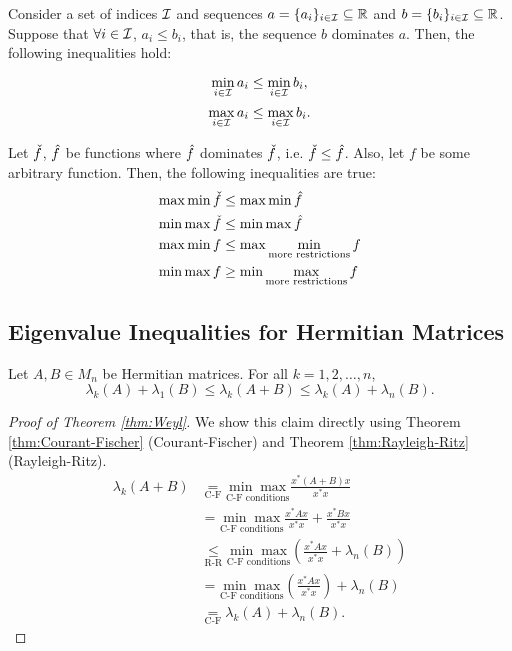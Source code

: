 \begin{note*}
\label{note:min-max-properties}
Consider a set of indices $\mathcal{I}$ and sequences $a = \{a_i\}_{i \in \mathcal{I}} \subseteq \mathbb R$ and $b = \{b_i\}_{i \in \mathcal{I}} \subseteq \mathbb R$. Suppose that $\forall i \in \mathcal{I}$, $a_i \leq b_i$, that is, the sequence $b$ dominates $a$. Then, the following inequalities hold:
\begin{multicols}{2}
\noindent $$
\min_{i \in \mathcal{I}} a_i \leq \min_{i \in \mathcal{I}} b_i,
$$
$$
\max_{i \in \mathcal{I}} a_i \leq \max_{i \in \mathcal{I}} b_i.
$$
\end{multicols}
Let $\Check{f}$, $\Hat{f}$ be functions where $\Hat{f}$ dominates $\Check{f}$, i.e. $\Check{f} \leq \Hat{f}$. Also, let $f$ be some arbitrary function. Then, the following inequalities are true:
\begin{align*}
    \max \min \Check{f} &\leq \max \min \Hat{f} \\
    \min \max \Check{f} &\leq \min \max \Hat{f} \\
    \max \min f &\leq \max \min_{\text{more restrictions}} f \\
    \min \max f &\geq \min \max_{\text{more restrictions}} f
\end{align*}
\end{note*}

\subsection{Eigenvalue Inequalities for Hermitian Matrices}

\begin{theorem}[Weyl]
\label{thm:Weyl}
Let $A, B \in M_n$ be Hermitian matrices. For all $k = 1, 2, \dots, n$,
$$
\lambda_k(A) + \lambda_1(B) \leq \lambda_k(A+B) \leq \lambda_k(A) + \lambda_n(B).
$$
\end{theorem}

\begin{proof}[Proof of Theorem \ref{thm:Weyl}]
We show this claim directly using Theorem \ref{thm:Courant-Fischer} (Courant-Fischer) and Theorem \ref{thm:Rayleigh-Ritz} (Rayleigh-Ritz).
\begin{align*}
    \lambda_k(A+B) 
        &\underset{\text{C-F}}{=} \underset{\text{C-F conditions}}{\min\max} \frac{x^*(A+B)x}{x^*x} \\
        &= \underset{\text{C-F conditions}}{\min\max} \frac{x^*Ax}{x^*x} + \frac{x^*Bx}{x^*x} \\
        &\underset{{\text{R-R}}}{\leq} \underset{\text{C-F conditions}}{\min\max} \left(\frac{x^*Ax}{x^*x} + \lambda_n(B)\right) \\
        &= \underset{\text{C-F conditions}}{\min\max} \left(\frac{x^*Ax}{x^*x}\right) + \lambda_n(B) \\
        &\underset{\text{C-F}}{=} \lambda_k(A) + \lambda_n(B).
\end{align*}
\end{proof}

